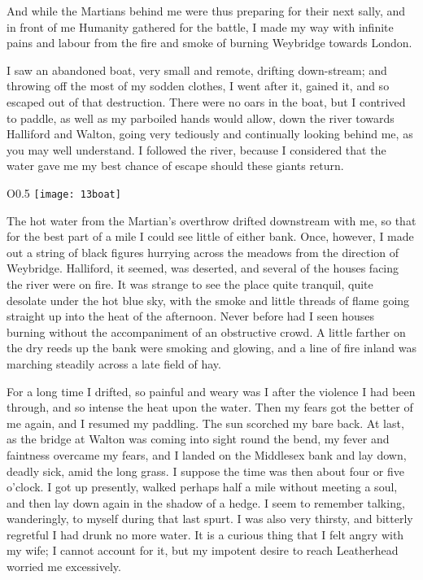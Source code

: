 And while the Martians behind me were thus preparing for their next sally, and in front of me Humanity gathered for the battle, I made my way with infinite pains and labour from the fire and smoke of burning Weybridge towards London.

I saw an abandoned boat, very small and remote, drifting down-stream; and throwing off the most of my sodden clothes, I went after it, gained it, and so escaped out of that destruction. There were no oars in the boat, but I contrived to paddle, as well as my parboiled hands would allow, down the river towards Halliford and Walton, going very tediously and continually looking behind me, as you may well understand. I followed the river, because I considered that the water gave me my best chance of escape should these giants return.

\begin{wrapfigure}{O}{0.5\textwidth}
\centering
\texttt{[image: 13boat]}
\end{wrapfigure}

The hot water from the Martian's overthrow drifted downstream with me, so that for the best part of a mile I could see little of either bank. Once, however, I made out a string of black figures hurrying across the meadows from the direction of Weybridge. Halliford, it seemed, was deserted, and several of the houses facing the river were on fire. It was strange to see the place quite tranquil, quite desolate under the hot blue sky, with the smoke and little threads of flame going straight up into the heat of the afternoon. Never before had I seen houses burning without the accompaniment of an obstructive crowd. A little farther on the dry reeds up the bank were smoking and glowing, and a line of fire inland was marching steadily across a late field of hay.

For a long time I drifted, so painful and weary was I after the violence I had been through, and so intense the heat upon the water. Then my fears got the better of me again, and I resumed my paddling. The sun scorched my bare back. At last, as the bridge at Walton was coming into sight round the bend, my fever and faintness overcame my fears, and I landed on the Middlesex bank and lay down, deadly sick, amid the long grass. I suppose the time was then about four or five o'clock. I got up presently, walked perhaps half a mile without meeting a soul, and then lay down again in the shadow of a hedge. I seem to remember talking, wanderingly, to myself during that last spurt. I was also very thirsty, and bitterly regretful I had drunk no more water. It is a curious thing that I felt angry with my wife; I cannot account for it, but my impotent desire to reach Leatherhead worried me excessively.

